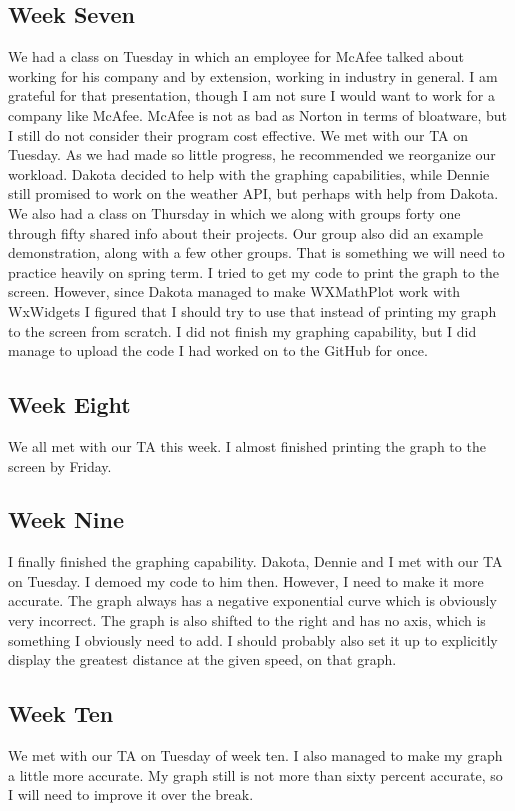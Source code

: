 \begin{singlespace}
\subsection{Week Seven}
We had a class on Tuesday in which an employee for McAfee talked about working for his company and by extension, working in industry in general.
I am grateful for that presentation, though I am not sure I would want to work for a company like McAfee.
McAfee is not as bad as Norton in terms of bloatware, but I still do not consider their program cost effective.
We met with our TA on Tuesday.
As we had made so little progress, he recommended we reorganize our workload.
Dakota decided to help with the graphing capabilities, while Dennie still promised to work on the weather API, but perhaps with help from Dakota.
We also had a class on Thursday in which we along with groups forty one through fifty shared info about their projects.
Our group also did an example demonstration, along with a few other groups.
That is something we will need to practice heavily on spring term.
I tried to get my code to print the graph to the screen.
However, since Dakota managed to make WXMathPlot work with WxWidgets I figured that I should try to use that instead of printing my graph to the screen from scratch.
I did not finish my graphing capability, but I did manage to upload the code I had worked on to the GitHub for once.

\subsection{Week Eight}
We all met with our TA this week.
I almost finished printing the graph to the screen by Friday.

\subsection{Week Nine}
I finally finished the graphing capability.
Dakota, Dennie and I met with our TA on Tuesday.
I demoed my code to him then.
However, I need to make it more accurate.
The graph always has a negative exponential curve which is obviously very incorrect.
The graph is also shifted to the right and has no axis, which is something I obviously need to add.
I should probably also set it up to explicitly display the greatest distance at the given speed, on that graph.

\subsection{Week Ten}
We met with our TA on Tuesday of week ten.
I also managed to make my graph a little more accurate.
My graph still is not more than sixty percent accurate, so I will need to improve it over the break.


\end{singlespace}
